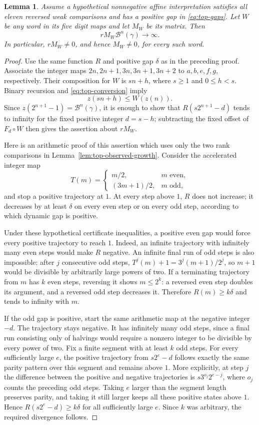 \documentclass[11pt,a4paper]{article}
\newtheorem{lemma}[theorem]{Lemma}
\begin{document}
\begin{lemma}\label{lem:top-mixed-growth}
Assume a hypothetical nonnegative affine interpretation satisfies all
eleven reversed weak comparisons and has a positive gap in
\eqref{eq:top-gaps}. Let $W$ be any word in its five digit maps and
let $M_W$ be its matrix. Then
\[
rM_W\mathcal B^n(\gamma)\longrightarrow\infty.
\]
In particular, $rM_W\ne0$, and hence $M_W\ne0$, for every such word.
\end{lemma}
\begin{proof}
Use the same function $R$ and positive gap $\delta$ as in the preceding
proof.
Associate the integer maps $2n,2n+1,3n,3n+1,3n+2$ to
$a,b,e,f,g$, respectively. Their composition for $W$ is $sn+h$,
where $s\ge1$ and $0\le h<s$. Binary recursion and
\eqref{eq:top-conversion} imply
\[
z(sn+h)\le W(z(n)).
\]
Since $z(2^{n+1}-1)=\mathcal B^n(\gamma)$, it is enough to show
that $R(s2^{n+1}-d)$ tends to infinity for the fixed positive integer
$d=s-h$; subtracting the fixed offset of $F_d\circ W$ then gives
the assertion about $rM_W$.

Here is an arithmetic proof of this assertion which uses only the two
rank comparisons in Lemma~\ref{lem:top-observed-growth}.
Consider the accelerated integer map
\[
T(m)=\begin{cases}m/2,&m\text{ even},\\(3m+1)/2,&m\text{ odd},\end{cases}
\]
and stop a positive trajectory at $1$.
At every step above $1$, $R$ does not increase; it decreases by at
least $\delta$ on every even step or on every odd step, according to
which dynamic gap is positive.

Under these hypothetical certificate inequalities, a positive even gap
would force every positive trajectory to reach $1$.
Indeed, an infinite trajectory with infinitely many even steps would
make $R$ negative. An infinite final run of odd steps is also
impossible: after $j$ consecutive odd steps,
$T^j(m)+1=3^j(m+1)/2^j$, so $m+1$ would be divisible by arbitrarily
large powers of two. If a terminating trajectory from $m$ has $k$
even steps, reversing it shows $m\le2^k$: a reversed even step doubles
its argument, and a reversed odd step decreases it. Therefore
$R(m)\ge k\delta$ and tends to infinity with $m$.

If the odd gap is positive, start the same arithmetic map at the
negative integer $-d$. The trajectory stays negative. It has
infinitely many odd steps, since a final run consisting only of
halvings would require a nonzero integer to be divisible by every
power of two. Fix a finite segment with at least $k$ odd steps.
For every sufficiently large $e$, the positive trajectory from
$s2^e-d$ follows exactly the same parity pattern over this segment
and remains above $1$. More explicitly, at step $j$ the difference
between the positive and negative trajectories is
$s3^{o_j}2^{e-j}$, where $o_j$ counts the preceding odd steps.
Taking $e$ larger than the segment length preserves parity, and taking
it still larger keeps all these positive states above $1$.
Hence $R(s2^e-d)\ge k\delta$ for all sufficiently large $e$.
Since $k$ was arbitrary, the required divergence follows.
\end{proof}
\end{document}
